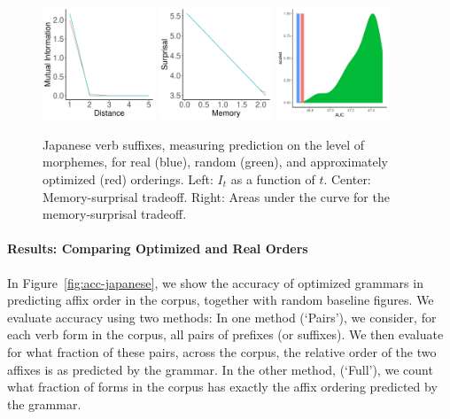 \begin{figure}
	\begin{center}
\includegraphics[width=0.3\textwidth]{figures/Japanese-suffixes-byMorphemes-it-heldout.pdf}
\includegraphics[width=0.3\textwidth]{figures/Japanese-suffixes-byMorphemes-memsurp-heldout.pdf}
\includegraphics[width=0.3\textwidth]{figures/Japanese-suffixes-byMorphemes-auc-hist-heldout.pdf}
\end{center}
	\caption{Japanese verb suffixes, measuring prediction on the level of morphemes, for real (blue), random (green), and approximately optimized (red) orderings. Left: $I_t$ as a function of $t$. Center: Memory-surprisal tradeoff. Right: Areas under the curve for the memory-surprisal tradeoff.}\label{fig:jap-morph}
\end{figure}


\paragraph{Results: Comparing Optimized and Real Orders}

In Figure~\ref{fig:acc-japanese}, we show the accuracy of optimized grammars in predicting affix order in the corpus, together with random baseline figures.
We evaluate accuracy using two methods:
In one method (`Pairs'), we consider, for each verb form in the corpus, all pairs of prefixes (or suffixes).
We then evaluate for what fraction of these pairs, across the corpus, the relative order of the two affixes is as predicted by the grammar.
In the other method, (`Full'), we count what fraction of forms in the corpus has exactly the affix ordering predicted by the grammar.





